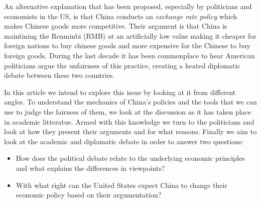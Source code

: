 An alternative explanation that has been proposed, especially by 
politicians and economists in the US, is that China conducts an 
\emph{exchange rate policy} which makes Chinese goods more competitive.
Their argument is that China is maintining the Renminbi (RMB) at an 
artificially low value making it cheaper for foreign nations to buy 
chinese goods and more expensive for the Chinese to buy foreign goods.  
During the last decade it has been commonplace to hear American 
politicians argue the unfairness of this practice, creating a heated 
diplomatic debate between these two countries.

In this article we intend to explore this issue by looking at it from 
different angles. To understand the mechanics of China's policies and 
the tools that we can use to judge the fairness of them, we look at the 
discussion as it has taken place in academic litteratue. Armed with this 
knowledge we turn to the politicians and look at how they present their 
arguments and for what reasons. Finally we aim to look at the academic 
and diplomatic debate in order to answer two questions:

\begin{itemize}
\item{How does the political debate relate to the underlying economic 
principles and what explains the differences in viewpoints?}
\item{With what right can the United States expect China to change their 
economic policy based on their argumentation?}
\end{itemize}
